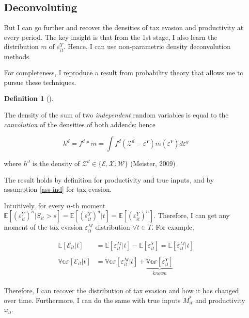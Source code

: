 \documentclass[
  12pt]{article}
\theoremstyle{definition}
\newtheorem{definition}{Definition}[section]
\theoremstyle{remark}
\begin{document}
\hypertarget{deconvoluting}{%
\subsection{Deconvoluting}\label{deconvoluting}}

But I can go further and recover the densities of tax evasion and
productivity at every period. The key insight is that from the 1st
stage, I also learn the distribution \(m\) of \(\varepsilon^Y_{it}\).
Hence, I can use non-parametric density deconvolution methods.

For completeness, I reproduce a result from probability theory that
allows me to pursue these techniques.

\leavevmode{}%
\begin{definition}[]\label{def-deconv}

The density of the sum of two \emph{independent} random variables is
equal to the \emph{convolution} of the densities of both addends; hence

\[h^d = f^d*m = \int f^d(\mathcal Z^d - \varepsilon^Y)m(\varepsilon^Y)d\varepsilon^y\]

where \(h^d\) is the density of \(\mathcal Z^d\in \{\mathcal{E,X,W}\}\)
(Meister, 2009)

\end{definition}

The result holds by definition for productivity and true inputs, and by
assumption \ref{ass-ind} for tax evasion.

Intuitively, for every \(n\)-th moment
\(\mathbb{E}[(\varepsilon^{Y}_{it})^n|S_{it}>s]=\mathbb{E}[(\varepsilon^{Y}_{it})^n|t]=\mathbb{E}[(\varepsilon^{Y}_{it})^n]\).
Therefore, I can get any moment of the tax evasion
\(\varepsilon^M_{it}\) distribution \(\forall t\in T\). For example,

\[
\begin{aligned}
  \mathbb{E}[\mathcal E_{it}|t]&=\mathbb{E}[\varepsilon^M_{it}|t]-\mathbb{E}[\varepsilon^Y_{it}]=\mathbb{E}[\varepsilon^M_{it}|t] \\
  \\
  \mathbb{Var}[\mathcal E_{it}|t]&=\mathbb{Var}[\varepsilon^M_{it}|t]
  +\underbrace{\mathbb{Var}[\varepsilon^Y_{it}]}_{known}\\
\end{aligned}
\]

Therefore, I can recover the distribution of tax evasion and how it has
changed over time. Furthermore, I can do the same with true inputs
\(M_{it}^*\) and productivity \(\omega_{it}\).
\end{document}
